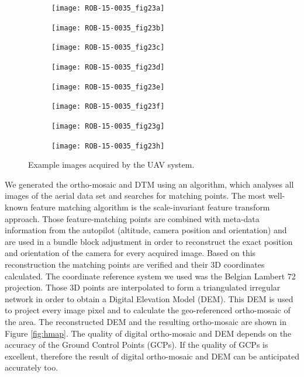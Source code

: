 \documentclass{article}
\begin{document}
\begin{figure}[h]
\centering
 \begin{subfigure} [b]{0.24\textwidth}
         \texttt{[image: ROB-15-0035\_fig23a]}
 \end{subfigure}
  \begin{subfigure} [b]{0.24\textwidth}
         \texttt{[image: ROB-15-0035\_fig23b]}
 \end{subfigure}
  \begin{subfigure} [b]{0.24\textwidth}
         \texttt{[image: ROB-15-0035\_fig23c]}
 \end{subfigure}
  \begin{subfigure} [b]{0.24\textwidth}
         \texttt{[image: ROB-15-0035\_fig23d]}
 \end{subfigure}
  \begin{subfigure} [b]{0.24\textwidth}
         \texttt{[image: ROB-15-0035\_fig23e]}
 \end{subfigure}
  \begin{subfigure} [b]{0.24\textwidth}
         \texttt{[image: ROB-15-0035\_fig23f]}
 \end{subfigure}
  \begin{subfigure} [b]{0.24\textwidth}
         \texttt{[image: ROB-15-0035\_fig23g]}
 \end{subfigure}
  \begin{subfigure} [b]{0.24\textwidth}
         \texttt{[image: ROB-15-0035\_fig23h]}
 \end{subfigure}
\caption{Example images acquired by the UAV system.}
\label{fig:pic}
\end{figure}
We generated the ortho-mosaic and DTM using an algorithm, which analyses all images of the aerial data set and searches for matching points.
The most well-known feature matching algorithm is the scale-invariant feature transform approach.
Those feature-matching points are combined with meta-data information from the autopilot (altitude, camera position and orientation) and are used in a bundle block adjustment in order to reconstruct the exact position and orientation of the camera for every acquired image. Based on this reconstruction the matching points are verified and their 3D coordinates calculated.
The coordinate reference system we used was the Belgian Lambert 72 projection. Those 3D points are interpolated to form a triangulated irregular network in order to obtain a Digital Elevation Model (DEM). This DEM is used to project every image pixel and to calculate the geo-referenced ortho-mosaic of the area.
The reconstructed DEM and the resulting ortho-mosaic are shown in Figure \ref{fig:hmap}. The quality of digital ortho-mosaic and DEM depends on the accuracy of the Ground Control Points (GCPs). If the quality of GCPs is excellent, therefore the result of digital ortho-mosaic and DEM can be anticipated accurately too.
\end{document}
